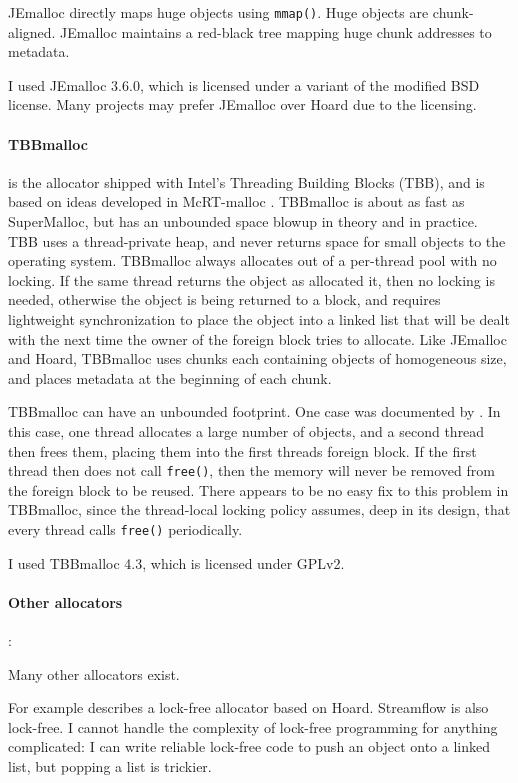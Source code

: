 \documentclass[natbib,sort&compress]{sigplanconf}
\newcommand{\code}[1]{\texttt{#1}}
\begin{document}
JEmalloc directly maps huge objects using \code{mmap()}.  Huge objects
are chunk-aligned.  JEmalloc maintains a red-black tree mapping huge
chunk addresses to metadata.

I used JEmalloc 3.6.0, which is licensed under a variant of the
modified BSD license.  Many projects may prefer JEmalloc over Hoard
due to the licensing.

{\paragraph{TBBmalloc}} \cite{KukanovVo07} is the allocator shipped
with Intel's Threading Building Blocks (TBB), and is based on ideas
developed in McRT-malloc \cite{HudsonSaAd06}.  TBBmalloc is about as
fast as SuperMalloc, but has an unbounded space blowup in theory and
in practice.  TBB uses a thread-private heap, and never returns space
for small objects to the operating system.  TBBmalloc always allocates
out of a per-thread pool with no locking.  If the same thread returns
the object as allocated it, then no locking is needed, otherwise the
object is being returned to a  block, and requires
lightweight synchronization to place the object into a linked list
that will be dealt with the next time the owner of the foreign block
tries to allocate.  Like JEmalloc and Hoard, TBBmalloc uses chunks
each containing objects of homogeneous size, and places metadata at
the beginning of each chunk.

TBBmalloc can have an unbounded footprint.  One case was documented by
\cite{Vyukov08}.  In this case, one thread allocates a large number of
objects, and a second thread then frees them, placing them into the
first threads foreign block.  If the first thread then does not call
\code{free()}, then the memory will never be removed from the foreign
block to be reused.  There appears to be no easy fix to this problem
in TBBmalloc, since the thread-local locking policy assumes, deep in
its design, that every thread calls \code{free()} periodically.

I used TBBmalloc 4.3, which is licensed under GPLv2.

{\paragraph{Other allocators}:} Many other allocators exist.

For example \cite{Michael04} describes a lock-free allocator based on
Hoard.  Streamflow \cite{SchneiderAnNi06} is also lock-free.  I cannot
handle the complexity of lock-free programming for anything
complicated: I can write reliable lock-free code to push an object
onto a linked list, but popping a list is trickier.
\end{document}
